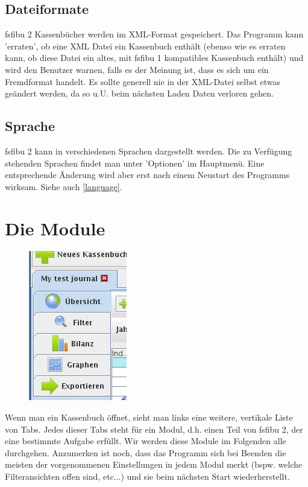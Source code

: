 \documentclass[a4paper,10pt,halfparskip,oneside,smallheadings]{scrbook}
\begin{document}
\subsection{Dateiformate}
fsfibu 2 Kassenbücher werden im XML-Format gespeichert. Das Programm kann 'erraten', ob eine XML Datei ein Kassenbuch enthält (ebenso wie es erraten kann, ob diese Datei ein altes, mit fsfibu 1 kompatibles Kassenbuch enthält) und wird den Benutzer warnen, falls es der Meinung ist, dass es sich um ein Fremdformat handelt. Es sollte generell nie in der XML-Datei selbst etwas geändert werden, da so u.U. beim nächsten Laden Daten verloren gehen.

\subsection{Sprache}
fsfibu 2 kann in verschiedenen Sprachen dargestellt werden. Die zu Verfügung stehenden Sprachen findet man unter 'Optionen' im Hauptmenü. Eine entsprechende Änderung wird aber erst nach einem Neustart des Programms wirksam. Siehe auch \ref{language}.

\section{Die Module}
\begin{figure}[h!]
 \includegraphics{modules}
\end{figure}

Wenn man ein Kassenbuch öffnet, sieht man links eine weitere, vertikale Liste von Tabs. Jedes dieser Tabs steht für ein Modul, d.h. einen Teil von fsfibu 2, der eine bestimmte Aufgabe erfüllt. Wir werden diese Module im Folgenden alle durchgehen. Anzumerken ist noch, dass das Programm sich bei Beenden die meisten der vorgenommenen Einstellungen in jedem Modul merkt (bspw. welche Filteransichten offen sind, etc...) und sie beim nächsten Start wiederherstellt.
\end{document}
